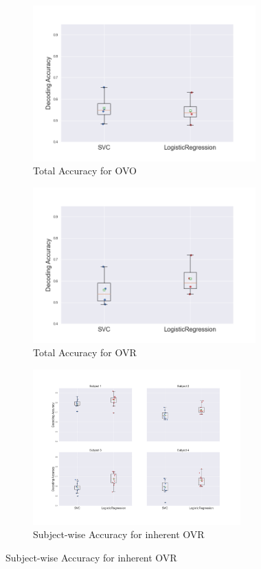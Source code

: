 \documentclass[11pt, a4paper]{article}
\begin{document}
\begin{figure}[hbt!]
    \centering
        \begin{subfigure}[b]{0.49\linewidth}
        \includegraphics[width=\linewidth, height=6cm]{acc_tot_OVO.png}
        \caption{Total Accuracy for OVO}
        \label{fig:tot_acc_ovo}
        \end{subfigure}
        \begin{subfigure}[b]{0.49\linewidth}
        \includegraphics[width=\linewidth, height=6cm]{acc_tot_OVR.png}
        \caption{Total Accuracy for OVR}
        \label{fig:tot_acc_ovr}
        \end{subfigure}
    	\begin{subfigure}[b]{0.49\linewidth}
        \includegraphics[width=\linewidth, height = 6cm]{some_subplots.png}%
        \caption{Subject-wise Accuracy for inherent OVR}

\end{subfigure}
\end{figure}
\end{document}
